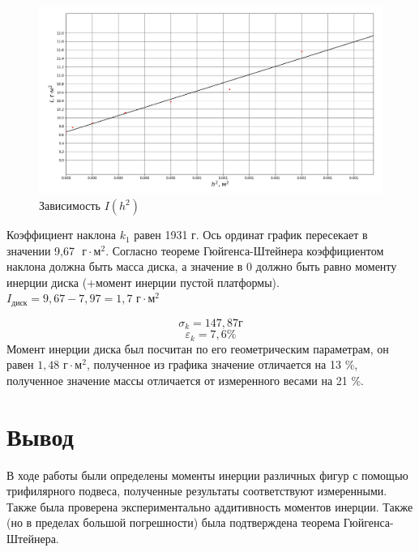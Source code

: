 \documentclass[a4paper, 12pt]{article}
\begin{document}
\begin{figure}[h]
    \centering
    \includegraphics[scale=0.5]{Screenshot 2023-11-29 134502.png}
    \caption{Зависимость $I(h^2)$}
    \label{fig:enter-label}
\end{figure}

Коэффициент наклона $k_1$ равен 1931 г. Ось ординат график пересекает в значении 9,67 $\text{ г}\cdot\text{м}^2$. Согласно теореме Гюйгенса-Штейнера коэффициентом наклона должна быть масса диска, а значение в 0 должно быть равно моменту инерции диска (+момент инерции пустой платформы). $I_\text{диск} = 9,67-7,97 = 1,7 \text{ г}\cdot\text{м}^2$

\[ \sigma_k = 147,87 г\]
\[ \varepsilon_k = 7,6 \%\]
Момент инерции диска был посчитан по его геометрическим параметрам, он равен $1,48 \text{ г}\cdot\text{м}^2$, полученное из графика значение отличается на 13 \%, полученное значение массы отличается от измеренного весами на 21 \%.

\section*{Вывод}
В ходе работы были определены моменты инерции различных фигур с помощью трифилярного подвеса, полученные результаты соответствуют измеренными. Также была проверена экспериментально аддитивность моментов инерции. Также (но в пределах большой погрешности) была подтверждена теорема Гюйгенса-Штейнера.
\end{document}
